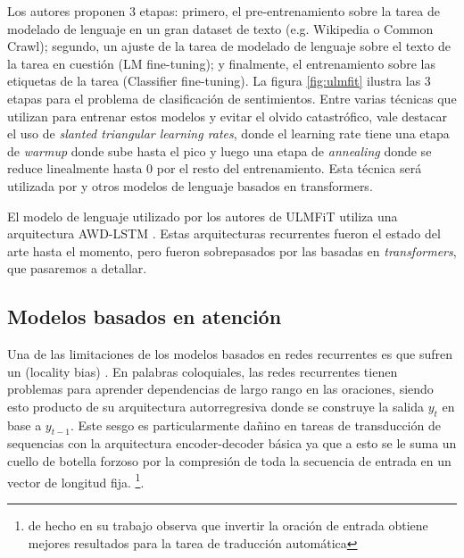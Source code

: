Los autores proponen 3 etapas: primero, el pre-entrenamiento sobre la tarea de modelado de lenguaje en un gran dataset de texto (e.g. Wikipedia o Common Crawl); segundo, un ajuste de la tarea de modelado de lenguaje sobre el texto de la tarea en cuestión (LM fine-tuning); y finalmente, el entrenamiento sobre las etiquetas de la tarea (Classifier fine-tuning). La figura \ref{fig:ulmfit} ilustra las 3 etapas para el problema de clasificación de sentimientos. Entre varias técnicas que utilizan para entrenar estos modelos y evitar el olvido catastrófico, vale destacar el uso de \emph{slanted triangular learning rates}, donde el learning rate tiene una etapa de \emph{warmup} donde sube hasta el pico y luego una etapa de \emph{annealing} donde se reduce linealmente hasta 0 por el resto del entrenamiento. Esta técnica será utilizada por \bert{} y otros modelos de lenguaje basados en transformers.

El modelo de lenguaje utilizado por los autores de ULMFiT utiliza una arquitectura AWD-LSTM \cite{merity2018regularizing}. Estas arquitecturas recurrentes fueron el estado del arte hasta el momento, pero fueron sobrepasados por las basadas en \emph{transformers}, que pasaremos a detallar.


\subsection{Modelos basados en atención}
\label{sec:02_transformers}

Una de las limitaciones de los modelos basados en redes recurrentes es que sufren un (locality bias) \cite{battaglia2018relational}. En palabras coloquiales, las redes recurrentes tienen problemas para aprender dependencias de largo rango en las oraciones, siendo esto producto de su arquitectura autorregresiva donde se construye la salida $y_t$ en base a $y_{t-1}$. Este sesgo es particularmente dañino en tareas de transducción de sequencias con la arquitectura encoder-decoder básica ya que a esto se le suma un cuello de botella forzoso por la compresión de toda la secuencia de entrada en un vector de longitud fija. \footnote{\citet{sutskever2014sequence} de hecho en su trabajo observa que invertir la oración de entrada obtiene mejores resultados para la tarea de traducción automática}.


